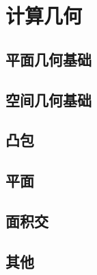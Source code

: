 \documentclass[12pt,a4paper,titlepage]{article}
\begin{document}
\section{\LARGE 计算几何}
	\subsection{平面几何基础}
    
    
    
    
    

	\subsection{空间几何基础}
    
    

	\subsection{凸包}
	
	
	
	
	

	\subsection{平面}
	
	
	
	
	

	\subsection{面积交}
	
	
	
	

	\subsection{其他}
    
\end{document}
